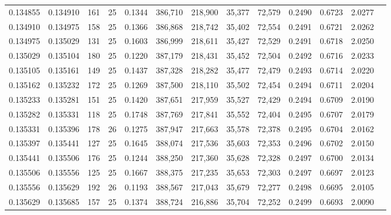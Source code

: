 \begin{tabular}{rrrrrrrrrrrrr}
0.134855 & 0.134910 &   161 &  25 &                                     0.1344 & 386,710 & 218,900 &  35,377 &  72,579 & 0.2490 & 0.6723 & 2.0277 \\
0.134910 & 0.134975 &   158 &  25 &                                     0.1366 & 386,868 & 218,742 &  35,402 &  72,554 & 0.2491 & 0.6721 & 2.0262 \\
0.134975 & 0.135029 &   131 &  25 &                                     0.1603 & 386,999 & 218,611 &  35,427 &  72,529 & 0.2491 & 0.6718 & 2.0250 \\
0.135029 & 0.135104 &   180 &  25 &                                     0.1220 & 387,179 & 218,431 &  35,452 &  72,504 & 0.2492 & 0.6716 & 2.0233 \\
0.135105 & 0.135161 &   149 &  25 &                                     0.1437 & 387,328 & 218,282 &  35,477 &  72,479 & 0.2493 & 0.6714 & 2.0220 \\
0.135162 & 0.135232 &   172 &  25 &                                     0.1269 & 387,500 & 218,110 &  35,502 &  72,454 & 0.2494 & 0.6711 & 2.0204 \\
0.135233 & 0.135281 &   151 &  25 &                                     0.1420 & 387,651 & 217,959 &  35,527 &  72,429 & 0.2494 & 0.6709 & 2.0190 \\
0.135282 & 0.135331 &   118 &  25 &                                     0.1748 & 387,769 & 217,841 &  35,552 &  72,404 & 0.2495 & 0.6707 & 2.0179 \\
0.135331 & 0.135396 &   178 &  26 &                                     0.1275 & 387,947 & 217,663 &  35,578 &  72,378 & 0.2495 & 0.6704 & 2.0162 \\
0.135397 & 0.135441 &   127 &  25 &                                     0.1645 & 388,074 & 217,536 &  35,603 &  72,353 & 0.2496 & 0.6702 & 2.0150 \\
0.135441 & 0.135506 &   176 &  25 &                                     0.1244 & 388,250 & 217,360 &  35,628 &  72,328 & 0.2497 & 0.6700 & 2.0134 \\
0.135506 & 0.135556 &   125 &  25 &                                     0.1667 & 388,375 & 217,235 &  35,653 &  72,303 & 0.2497 & 0.6697 & 2.0123 \\
0.135556 & 0.135629 &   192 &  26 &                                     0.1193 & 388,567 & 217,043 &  35,679 &  72,277 & 0.2498 & 0.6695 & 2.0105 \\
0.135629 & 0.135685 &   157 &  25 &                                     0.1374 & 388,724 & 216,886 &  35,704 &  72,252 & 0.2499 & 0.6693 & 2.0090 \\

\end{tabular}

